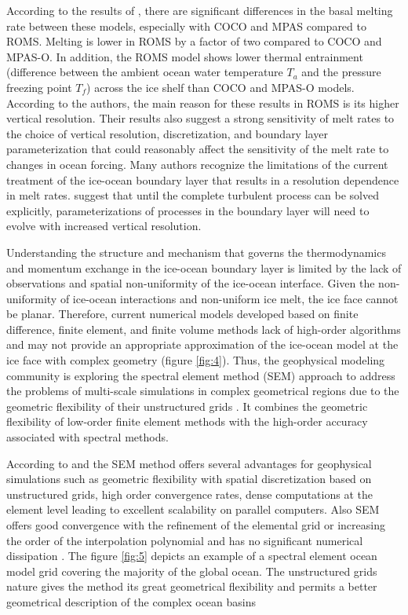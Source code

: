 \documentclass[11pt,a4paper]{article}
\begin{document}
	
	
	According to the results of \cite{gwyther2020vertical}, there are significant differences in the basal melting rate between these models, especially with COCO and MPAS compared to ROMS. Melting is lower in ROMS by a factor of two compared to COCO and MPAS-O. In addition, the ROMS model shows lower thermal entrainment (difference between the ambient ocean water temperature $T_a$ and the pressure freezing point $T_f$) across the ice shelf than COCO and MPAS-O models. According to the authors, the main reason for these results in ROMS is its higher vertical resolution. Their results also suggest a strong sensitivity of melt rates to the choice of vertical resolution, discretization, and boundary layer parameterization that could reasonably affect the sensitivity of the melt rate to changes in ocean forcing.  Many authors recognize the limitations of the current treatment of the ice-ocean boundary layer that results in a resolution dependence in melt rates. \cite{gwyther2020vertical} suggest that until the complete turbulent process can be solved explicitly, parameterizations of processes in the boundary layer will need to evolve with increased vertical resolution.
	
	Understanding the structure and mechanism that governs the thermodynamics and momentum exchange in the ice-ocean boundary layer is limited by the lack of observations and spatial non-uniformity of the ice-ocean interface. Given the non-uniformity of ice-ocean interactions and non-uniform ice melt, the ice face cannot be planar. Therefore, current numerical models developed based on finite difference, finite element, and finite volume methods lack of high-order algorithms and may not provide an appropriate approximation of the ice-ocean model at the ice face with complex geometry (figure \ref{fig:4}). Thus, the geophysical modeling community is exploring the spectral element method (SEM) approach to address the problems of multi-scale simulations in complex geometrical regions due to the geometric flexibility of their unstructured grids \citep{iskandarani2002multi}. It combines the geometric flexibility of low-order finite element methods with the high-order accuracy associated with spectral methods. 
	
	According to \cite{iskandarani2002multi} and \cite{ilicak2009non} the SEM method offers several advantages for geophysical simulations such as geometric flexibility with spatial discretization based on unstructured grids, high order convergence rates, dense computations at the element level leading to excellent scalability on parallel computers. Also SEM offers good convergence with the refinement of the elemental grid or increasing the order of the interpolation polynomial and has no significant numerical dissipation \citep{ilicak2009non}. The figure \ref{fig:5} depicts an example of a spectral element ocean model grid covering the majority of the global ocean. The unstructured grids nature gives the method its great geometrical flexibility and permits a better geometrical description of the complex ocean basins
	
\end{document}
